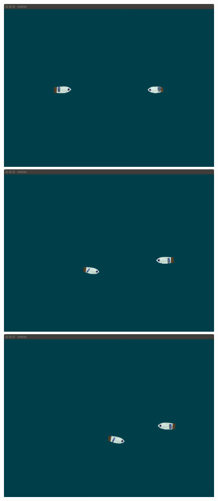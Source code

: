     \begin{figure}[H]
        \centering
        \includegraphics[scale=0.2]{figs/Experiment_HeadOn_1.png}
        \includegraphics[scale=0.2]{figs/Experiment_HeadOn_3.png}\\
        \includegraphics[scale=0.2]{figs/Experiment_HeadOn_4.png}

\end{figure}
